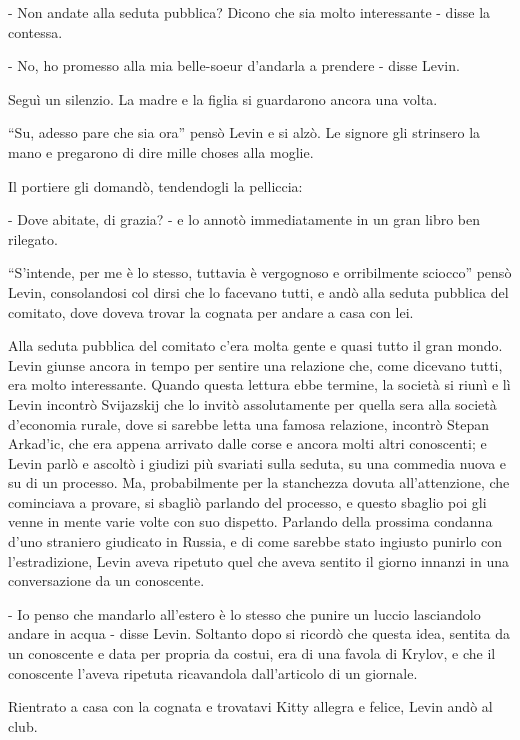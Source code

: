 - Non andate alla seduta pubblica? Dicono che sia molto interessante - disse la contessa. 

- No, ho promesso alla mia belle-soeur d'andarla a prendere - disse Levin. 

Seguì un silenzio. La madre e la figlia si guardarono ancora una volta. 

``Su, adesso pare che sia ora'' pensò Levin e si alzò. Le signore gli strinsero la mano e pregarono di dire mille choses alla moglie. 

Il portiere gli domandò, tendendogli la pelliccia: 

- Dove abitate, di grazia? - e lo annotò immediatamente in un gran libro ben rilegato. 

``S'intende, per me è lo stesso, tuttavia è vergognoso e orribilmente sciocco'' pensò Levin, consolandosi col dirsi che lo facevano tutti, e andò alla seduta pubblica del comitato, dove doveva trovar la cognata per andare a casa con lei. 

Alla seduta pubblica del comitato c'era molta gente e quasi tutto il gran mondo. Levin giunse ancora in tempo per sentire una relazione che, come dicevano tutti, era molto interessante. Quando questa lettura ebbe termine, la società si riunì e lì Levin incontrò Svijazskij che lo invitò assolutamente per quella sera alla società d'economia rurale, dove si sarebbe letta una famosa relazione, incontrò Stepan Arkad'ic, che era appena arrivato dalle corse e ancora molti altri conoscenti; e Levin parlò e ascoltò i giudizi più svariati sulla seduta, su una commedia nuova e su di un processo. Ma, probabilmente per la stanchezza dovuta all'attenzione, che cominciava a provare, si sbagliò parlando del processo, e questo sbaglio poi gli venne in mente varie volte con suo dispetto. Parlando della prossima condanna d'uno straniero giudicato in Russia, e di come sarebbe stato ingiusto punirlo con l'estradizione, Levin aveva ripetuto quel che aveva sentito il giorno innanzi in una conversazione da un conoscente. 

- Io penso che mandarlo all'estero è lo stesso che punire un luccio lasciandolo andare in acqua - disse Levin. Soltanto dopo si ricordò che questa idea, sentita da un conoscente e data per propria da costui, era di una favola di Krylov, e che il conoscente l'aveva ripetuta ricavandola dall'articolo di un giornale. 

Rientrato a casa con la cognata e trovatavi Kitty allegra e felice, Levin andò al club. 


